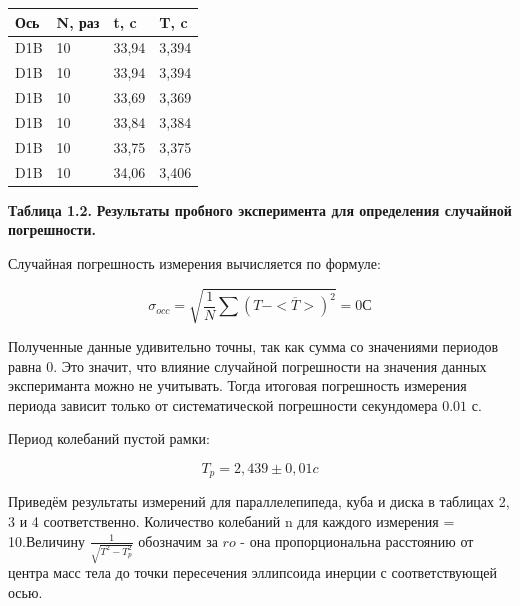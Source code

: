\begin{table}[H]
\centering
\begin{tabular}{|l|l|l|l|}
\hline
Ось & N, раз & t, c  & T, c  \\ \hline
D1B & 10     & 33,94 & 3,394 \\ \hline
D1B & 10     & 33,94 & 3,394 \\ \hline
D1B & 10     & 33,69 & 3,369 \\ \hline
D1B & 10     & 33,84 & 3,384 \\ \hline
D1B & 10     & 33,75 & 3,375 \\ \hline
D1B & 10     & 34,06 & 3,406 \\ \hline
\end{tabular}
\begin{flushright}
{\scriptsize \textbf{Таблица 1.2.} \textbf {Результаты пробного эксперимента для определения случайной погрешности.}}
\end{flushright}
\end{table}


    Случайная погрешность измерения вычисляется по формуле:
    
\[\sigma_{occ} = \sqrt{\frac{1}{N}\sum(T - <\overline{T}>)^2} = 0 С\]

    Полученные данные удивительно точны, так как сумма со значениями периодов равна 0. Это значит, что влияние случайной погрешности на значения данных экспериманта можно не учитывать. Тогда итоговая погрешность измерения периода зависит только от систематической погрешности секундомера $0.01$ с.
    
    
    Период колебаний пустой рамки: 
    
\[T_{p} = 2,439 \pm 0,01 c\]

    Приведём результаты измерений для параллелепипеда, куба и диска в таблицах 2, 3 и 4 соответственно. Количество колебаний n для каждого измерения = 10.Величину $\frac{1}{\sqrt{T^2 - T_p^2}}$ обозначим за $ro$ - она пропорциональна расстоянию от центра масс тела до точки пересечения эллипсоида инерции с соответствующей осью.\\\\\\\\\\\\\\\\\\\\\\\\\
    

